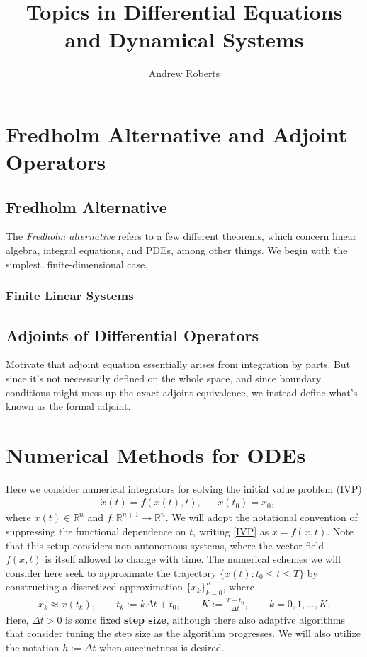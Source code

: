 \documentclass[12pt]{article}
\title{Topics in Differential Equations and Dynamical Systems}
\author{Andrew Roberts}
\newcommand{\R}{\mathbb{R}}
\begin{document}
\maketitle
\tableofcontents
\newpage

\section{Fredholm Alternative and Adjoint Operators}

\subsection{Fredholm Alternative}
The \textit{Fredholm alternative} refers to a few different theorems, which concern linear algebra, integral equations, and PDEs, among other things. 
We begin with the simplest, finite-dimensional case. 

\subsubsection{Finite Linear Systems}

\subsection{Adjoints of Differential Operators}
Motivate that adjoint equation essentially arises from integration by parts. But since it's not necessarily defined on the whole space, and since 
boundary conditions might mess up the exact adjoint equivalence, we instead define what's known as the formal adjoint. 

\section{Numerical Methods for ODEs}
Here we consider numerical integrators for solving the initial value problem (IVP) 
\begin{align}
&\dot{x}(t) = f(x(t), t), &&x(t_0) = x_0, \label{IVP}
\end{align}
where $x(t) \in \R^n$ and $f: \R^{n+1} \to \R^n$. We will adopt the notational convention of suppressing the 
functional dependence on $t$, writing \ref{IVP} as $\dot{x} = f(x,t)$. Note that this setup considers non-autonomous 
systems, where the vector field $f(x,t)$ is itself allowed to change with time. The numerical schemes we will consider 
here seek to approximate the trajectory $\{x(t) : t_0 \leq t \leq T\}$ by constructing a discretized approximation 
$\{x_k\}_{k=0}^{K}$, where 
\begin{align}
x_k \approx x(t_k), \qquad t_k := k \Delta t + t_0,  \qquad K := \frac{T-t_0}{\Delta t},  \qquad k = 0, 1, \dots, K.
\end{align}
Here, $\Delta t > 0$ is some fixed \textbf{step size}, although there also adaptive algorithms that consider tuning the step size as the algorithm progresses. 
We will also utilize the notation $h := \Delta t$ when succinctness is desired. 
\end{document}
